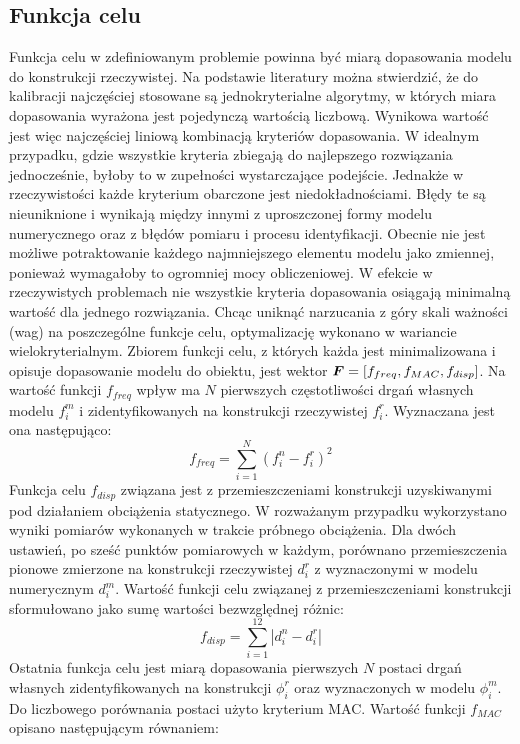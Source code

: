 \subsection{Funkcja celu}
Funkcja celu w zdefiniowanym problemie powinna być miarą dopasowania modelu do konstrukcji rzeczywistej. Na podstawie literatury można stwierdzić, że do kalibracji najczęściej stosowane są jednokryterialne algorytmy, w których miara dopasowania wyrażona jest pojedynczą wartością liczbową. Wynikowa wartość jest więc najczęściej liniową kombinacją kryteriów dopasowania. W idealnym przypadku, gdzie wszystkie kryteria zbiegają do najlepszego rozwiązania jednocześnie, byłoby to w zupełności wystarczające podejście. Jednakże w rzeczywistości każde kryterium obarczone jest niedokładnościami. Błędy te są nieuniknione i wynikają między innymi z uproszczonej formy modelu numerycznego oraz z błędów pomiaru i procesu identyfikacji. Obecnie nie jest możliwe potraktowanie każdego najmniejszego elementu modelu jako zmiennej, ponieważ wymagałoby to ogromniej mocy obliczeniowej. W efekcie w rzeczywistych problemach nie wszystkie kryteria dopasowania osiągają minimalną wartość dla jednego rozwiązania. Chcąc uniknąć narzucania z góry skali ważności (wag) na poszczególne funkcje celu, optymalizację wykonano w wariancie wielokryterialnym. Zbiorem funkcji celu, z których każda jest minimalizowana i opisuje dopasowanie modelu do obiektu, jest wektor $\bm{F}=[f_{freq},f_{MAC},f_{disp}]$. Na wartość funkcji $f_{freq}$ wpływ ma $N$ pierwszych częstotliwości drgań własnych modelu $f_i^m$ i zidentyfikowanych na konstrukcji rzeczywistej $f_i^r$. Wyznaczana jest ona następująco:
\begin{equation} \label{eq:wk2_calib_f_freq}
f_{freq}=\sum_{i=1}^{N} (f_i^n - f_i^r)^2
\end{equation}
Funkcja celu $f_{disp}$ związana jest z przemieszczeniami konstrukcji uzyskiwanymi pod działaniem obciążenia statycznego. W rozważanym przypadku wykorzystano wyniki pomiarów wykonanych w trakcie próbnego obciążenia. Dla dwóch ustawień, po sześć punktów pomiarowych w każdym, porównano przemieszczenia pionowe zmierzone na konstrukcji rzeczywistej $d_i^r$ z wyznaczonymi w modelu numerycznym $d_i^m$. Wartość funkcji celu związanej z przemieszczeniami konstrukcji sformułowano jako sumę wartości bezwzględnej różnic:
\begin{equation} \label{eq:wk2_calib_f_disp}
	f_{disp}=\sum_{i=1}^{12} |d_i^n - d_i^r|
\end{equation}
Ostatnia funkcja celu jest miarą dopasowania pierwszych $N$ postaci drgań własnych zidentyfikowanych na konstrukcji $\phi_i^r$ oraz wyznaczonych w modelu $\phi_i^m$. Do liczbowego porównania postaci użyto kryterium MAC. Wartość funkcji $f_{MAC}$ opisano następującym równaniem:
